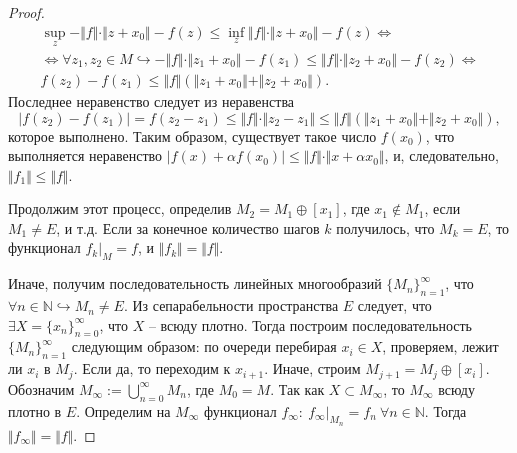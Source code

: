 \begin{proof}
    \begin{gather*}
    \sup _{z} -\Vert f\Vert \cdotp \Vert z+x_{0}\Vert -f( z) \leqslant \inf_{z}\Vert f\Vert \cdotp \Vert z+x_{0}\Vert -f( z) \Leftrightarrow \\
    \Leftrightarrow \forall z_{1} ,z_{2} \in M\hookrightarrow -\Vert f\Vert \cdotp \Vert z_{1} +x_{0}\Vert -f( z_{1}) \leqslant \Vert f\Vert \cdotp \Vert z_{2} +x_{0}\Vert -f( z_{2}) \Leftrightarrow \\
    f( z_{2}) -f( z_{1}) \leqslant \Vert f\Vert (\Vert z_{1} +x_{0}\Vert +\Vert z_{2} +x_{0}\Vert ) .
    \end{gather*}
    Последнее неравенство следует из неравенства
    \begin{equation*}
    | f( z_{2}) -f( z_{1})| =f( z_{2} -z_{1}) \leqslant \Vert f\Vert \cdotp \Vert z_{2} -z_{1}\Vert \leqslant \Vert f\Vert (\Vert z_{1} +x_{0}\Vert +\Vert z_{2} +x_{0}\Vert ) ,
    \end{equation*}
    которое выполнено. Таким образом, существует такое число $\displaystyle f( x_{0})$, что выполняется неравенство $\displaystyle | f( x) +\alpha f( x_{0})| \leqslant \Vert f\Vert \cdotp \Vert x+\alpha x_{0}\Vert $, и, следовательно, $\displaystyle \Vert f_{1}\Vert \leqslant \Vert f\Vert $.
    
    Продолжим этот процесс, определив $\displaystyle M_{2} =M_{1} \oplus [ x_{1}]$, где $\displaystyle x_{1} \notin M_{1}$, если $\displaystyle M_{1} \neq E$, и т.д. Если за конечное количество шагов $\displaystyle k$ получилось, что $\displaystyle M_{k} =E$, то функционал $\displaystyle f_{k} |_{M} =f$, и $\displaystyle \Vert f_{k}\Vert =\Vert f\Vert $.
    
    Иначе, получим последовательность линейных многообразий $\displaystyle \{M_{n}\}_{n=1}^{\infty }$, что $\displaystyle \forall n\in \mathbb{N} \hookrightarrow M_{n} \neq E$. Из сепарабельности пространства $\displaystyle E$ следует, что $\displaystyle \exists X=\{x_{n}\}_{n=0}^{\infty }$, что $\displaystyle X$ -- всюду плотно. Тогда построим последовательность $\displaystyle \{M_{n}\}_{n=1}^{\infty }$ следующим образом: по очереди перебирая $\displaystyle x_{i} \in X$, проверяем, лежит ли $\displaystyle x_{i}$ в $\displaystyle M_{j}$. Если да, то переходим к $\displaystyle x_{i+1}$. Иначе, строим $\displaystyle M_{j+1} =M_{j} \oplus [ x_{i}]$. Обозначим $\displaystyle M_{\infty } :=\bigcup _{n=0}^{\infty } M_{n}$, где $\displaystyle M_{0} =M$. Так как $\displaystyle X\subset M_{\infty }$, то $\displaystyle M_{\infty }$ всюду плотно в $\displaystyle E$. Определим на $\displaystyle M_{\infty }$ функционал $\displaystyle f_{\infty } :\ f_{\infty } |_{M_{n}} =f_{n} \ \forall n\in \mathbb{N}$. Тогда $\displaystyle \Vert f_{\infty }\Vert =\Vert f\Vert $.
    

\end{proof}
